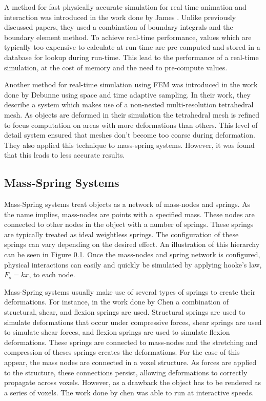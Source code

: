 A method for fast physically accurate simulation for real time animation and interaction was 
introduced in the work done by James \etal \cite{ArtDefo-Accurate-Real-Time}. 
Unlike previously discussed papers, they used a combination of boundary 
integrals and the boundary element method. To achieve real-time performance, values which are 
typically too expensive to calculate at run time are pre computed and stored in a database for 
lookup during run-time. This lead to the performance of a real-time simulation, at the cost of 
memory and the need to pre-compute values.

Another method for real-time simulation using FEM was introduced in the work done by Debunne \etal 
\cite{Dynamic-Real-Time-Deformations-Using} 
using space and time adaptive sampling. In their work, they describe a system which makes use of a 
non-nested multi-resolution tetrahedral mesh. As objects are deformed in their simulation the 
tetrahedral mesh is refined to focus computation on areas with more deformations than others. This 
level of detail system ensured that meshes don’t become too coarse during deformation. They also 
applied this technique to mass-spring systems. However, it was found that this leads to less 
accurate results.


\subsection{Mass-Spring Systems}


Mass-Spring systems treat objects as a network of mass-nodes and springs. As the name implies, 
mass-nodes are points with a specified mass. These nodes are connected to other nodes in the object
with a number of springs. These springs are typically treated as ideal weightless springs. The 
configuration of these springs can vary depending on the desired effect. An illustration of this 
hierarchy can be seen in Figure \ref{}.
Once the mass-nodes and 
spring network is configured, physical interactions can easily and quickly be simulated by applying
hooke's law, \(F_s = kx\), to each node. 

Mass-Spring systems usually make use of several types of springs to create their deformations. For
instance, in the work done by Chen \etal \cite{Physically-Based-Animation-of-Volumetric-Objects} a
combination of structural, shear, and flexion springs are used. Structural springs are used to
simulate deformations that occur under compressive forces, shear springs are used to simulate shear
forces, and flexion springs are used to simulate flexion deformations. %
These springs are connected to mass-nodes and the stretching and compression of theses springs 
creates the deformations. For the case of this appear, the mass nodes are connected in a voxel 
structure. As forces are applied to the structure, these connections persist, allowing deformations
to correctly propagate across voxels. However, as a drawback the object has to be rendered as a 
series of voxels. The work done by chen \etal was able to run at interactive speeds.

